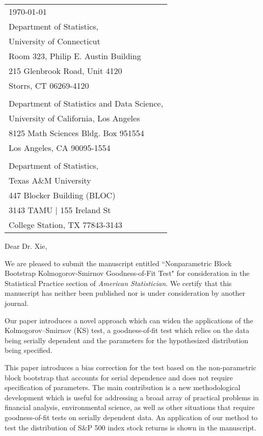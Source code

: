 \documentclass{article}
\begin{document}
\hfill
\begin{tabular}{ l @{} }
  \today \\[12pt] %
  Department of Statistics,\\
  University of Connecticut\\
  Room 323, Philip E. Austin Building\\
  215 Glenbrook Road, Unit 4120\\
  Storrs, CT 06269-4120\\
  \\
  Department of Statistics and Data Science,\\
  University of California, Los Angeles\\
  8125 Math Sciences Bldg. Box 951554\\
  Los Angeles, CA 90095-1554\\
  \\
  Department of Statistics,\\
  Texas A\&M University\\
  447 Blocker Building (BLOC)\\
  3143 TAMU | 155 Ireland St\\
  College Station, TX 77843-3143
\end{tabular}



\bigskip

Dear Dr. Xie,

\bigskip

We are pleased to submit the manuscript entitled ``Nonparametric Block Bootstrap 
Kolmogorov-Smirnov Goodness-of-Fit Test" for 
consideration in the Statistical Practice section of 
\textit{American Statistician}. We certify that this 
manuscript has neither been published nor is under consideration by another 
journal.

Our paper introduces a novel approach
which can widen the applications of the Kolmogorov--Smirnov (KS) test, a 
goodness-of-fit test which relies on the data
being serially dependent and the parameters for the hypothesized distribution
being specified. 

This paper introduces a bias correction for the test based on the non-parametric 
block bootstrap that accounts for serial dependence and does not require
specification of parameters.
The main contribution is a new methodological development which is useful
for addressing a broad array of
practical problems in financial analysis, environmental science, as 
well as other situations that require goodness-of-fit tests on serially
dependent data. An application of our method to test the distribution
of S\&P 500 index stock returns is shown in the manuscript.
\end{document}
